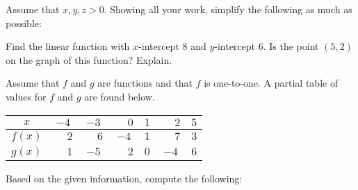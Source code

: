 \documentclass[12pt,letterpaper]{exam}
\begin{document}
\begin{questions}



\newpage
\question Assume that $x, y, z > 0$. Showing all your work, simplify the following as much as possible: \pvspace{0.2cm}




\newpage
\question[10] Find the linear function with $x$-intercept 8 and $y$-intercept 6. Is the point $(5, 2)$ on the graph of this function? Explain. 



\newpage
\question Assume that $f$ and $g$ are functions and that $f$ is one-to-one. A partial table of values for $f$ and $g$ are found below. \par
	\begin{table}[ht]
	\centering
	\begin{tabular}{|c||c|c|c|c|c|c|} \hline 
	$x$ & $-4$ & $-3$ & $\phantom{-}0$ & $1$ & $\phantom{-}2$ & $5$ \\ \hline \hline
	$f(x)$ & $\phantom{-}2$ & $\phantom{-}6$ & $-4$ & $1$ & $\phantom{-}7$ & $3$ \\ \hline
	$g(x)$ & $\phantom{-}1$ & $-5$ & $\phantom{-}2$ & $0$ & $-4$ & $6$ \\ \hline 
	\end{tabular}
	\end{table} \par
Based on the given information, compute the following: \pspace


\end{questions}
\end{document}
